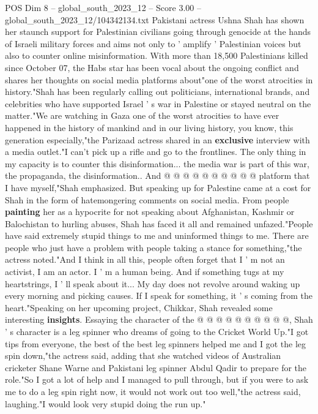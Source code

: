 \begin{textsample}{POS Dim 8 – global\_south\_2023\_12 – Score 3.00 – global\_south\_2023\_12/104342134.txt}  \label{ex:f8_pos_440}
Pakistani actress Ushna Shah has shown her staunch support for Palestinian civilians going through genocide at the hands of Israeli military forces and aims not only to ' amplify ' Palestinian voices but also to counter online misinformation.
With more than 18,500 Palestinians killed since October 07, the Habs star has been vocal about the ongoing conflict and shares her thoughts on social media platforms about"one of the worst atrocities in history."Shah has been regularly calling out politicians, international brands, and celebrities who have supported Israel ' s war in Palestine or stayed neutral on the matter."We are watching in Gaza one of the worst atrocities to have ever happened in the history of mankind and in our living history, you know, this generation especially,"the Parizaad actress shared in an \textbf{exclusive} interview with a media outlet."I can't pick up a rifle and go to the frontlines.
The only thing in my capacity is to counter this disinformation... the media war is part of this war, the propaganda, the disinformation..
And @ @ @ @ @ @ @ @ @ @ platform that I have myself,"Shah emphasized.
But speaking up for Palestine came at a cost for Shah in the form of hatemongering comments on social media.
From people \textbf{painting} her as a hypocrite for not speaking about Afghanistan, Kashmir or Balochistan to hurling abuses, Shah has faced it all and remained unfazed."People have said extremely stupid things to me and uninformed things to me.
There are people who just have a problem with people taking a stance for something,"the actress noted."And I think in all this, people often forget that I ' m not an activist, I am an actor.
I ' m a human being.
And if something tugs at my heartstrings, I ' ll speak about it...
My day does not revolve around waking up every morning and picking causes.
If I speak for something, it ' s coming from the heart."Speaking on her upcoming project, Chikkar, Shah revealed some interesting \textbf{insights}.
Essaying the character of the @ @ @ @ @ @ @ @ @ @, Shah ' s character is a leg spinner who dreams of going to the Cricket World Up."I got tips from everyone, the best of the best leg spinners helped me and I got the leg spin down,"the actress said, adding that she watched videos of Australian cricketer Shane Warne and Pakistani leg spinner Abdul Qadir to prepare for the role."So I got a lot of help and I managed to pull through, but if you were to ask me to do a leg spin right now, it would not work out too well,"the actress said, laughing."I would look very stupid doing the run up."

\end{textsample}
